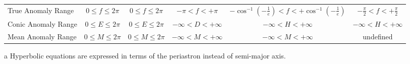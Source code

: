 \documentclass[a4paper,fleqn,usenatbib]{mnras}
\begin{document}
\begin{table}
\begin{threeparttable}
\begin{tabular}{l c c c c c}
 True Anomaly Range & $0\leq f \leq 2\pi$ & $0\leq f \leq 2\pi$ & $-\pi< f < +\pi$ & $-\cos^{-1}{(-\frac{1}{e})} < f < +\cos^{-1}{(-\frac{1}{e})}$ & $-\frac{\pi}{2} < f < +\frac{\pi}{2}$ \\
 Conic Anomaly Range & $0\leq E \leq 2\pi$ & $0\leq E \leq 2\pi$ & $-\infty < D < +\infty$ & $-\infty< H < +\infty$ & $-\infty< H < +\infty$ \\
 Mean Anomaly Range & $0\leq M \leq 2\pi$ & $0\leq M \leq 2\pi$ & $-\infty< M < +\infty$ & $-\infty < M < +\infty$ & undefined \\
 \hline
 \hline
\end{tabular}
\label{tab:summary}
	\begin{tablenotes}
	\small
\item[a]{Hyperbolic equations are expressed in terms of the periastron instead of semi-major axis.}
	\end{tablenotes}
\end{threeparttable}
\end{table}



\bsp	%
\label{lastpage}
\end{document}
